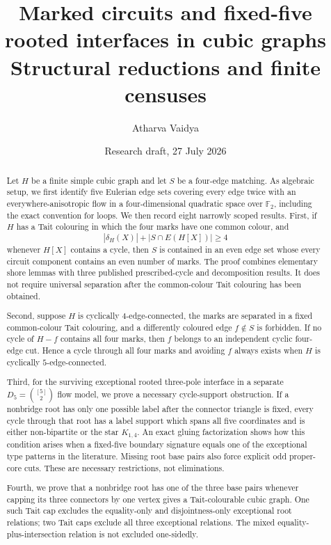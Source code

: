 \documentclass[11pt]{article}
\title{\vspace{-1.4cm}\textbf{\color{navy}
Marked circuits and fixed-five rooted interfaces in cubic graphs}\\[0.35em]
\large Structural reductions and finite censuses}
\author{Atharva Vaidya}
\date{Research draft, 27 July 2026}
\theoremstyle{definition}
\theoremstyle{remark}
\begin{document}
\maketitle

\begin{abstract}
Let \(H\) be a finite simple cubic graph and let \(S\) be a
four-edge matching.  As algebraic setup, we first identify five
Eulerian edge sets covering every edge twice with an
everywhere-anisotropic flow in a four-dimensional quadratic space over
\(\mathbb F_2\), including the exact convention for loops.  We then
record eight narrowly scoped results.
First, if \(H\) has a Tait colouring in which the four marks have one
common colour, and
\[
  |\delta_H(X)|+|S\cap E(H[X])|\geq 4
\]
whenever \(H[X]\) contains a cycle, then \(S\) is contained in an even
edge set whose every circuit component contains an even number of marks.
The proof combines elementary shore lemmas with three published
prescribed-cycle and decomposition results.  It does not require
universal separation after the common-colour Tait colouring has been
obtained.

Second, suppose \(H\) is cyclically \(4\)-edge-connected, the marks are
separated in a fixed common-colour Tait colouring, and a differently
coloured edge \(f\notin S\) is forbidden.  If no cycle of \(H-f\)
contains all four marks, then \(f\) belongs to an independent cyclic
four-edge cut.  Hence a cycle through all four marks and avoiding \(f\)
always exists when \(H\) is cyclically \(5\)-edge-connected.

Third, for the surviving exceptional rooted three-pole interface in a
separate \(D_5=\binom{[5]}2\) flow model, we prove a necessary
cycle-support obstruction.  If a nonbridge root has only one possible
label after the connector triangle is fixed, every cycle through that
root has a label support which spans all five coordinates and is either
non-bipartite or the star \(K_{1,4}\).  An exact gluing factorization
shows how this condition arises when a fixed-five boundary signature
equals one of the exceptional type patterns in the literature.  Missing
root base pairs also force explicit odd proper-core cuts.  These are
necessary restrictions, not eliminations.

Fourth, we prove that a nonbridge root has one of the three base pairs
whenever capping its three connectors by one vertex gives a
Tait-colourable cubic graph.  One such Tait cap excludes the
equality-only and disjointness-only exceptional root relations; two
Tait caps exclude all three exceptional relations.  The mixed
equality-plus-intersection relation is not excluded one-sidedly.


\end{abstract}
\end{document}
